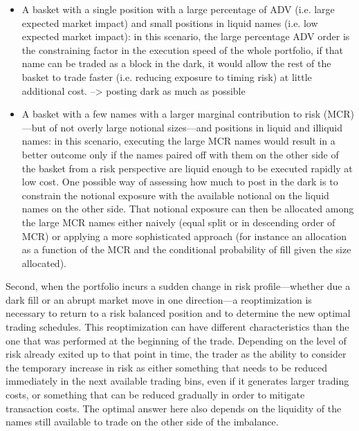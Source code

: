 \begin{itemize}
\item A basket with a single position with a large percentage of ADV (i.e. large expected market impact) and small positions in liquid names (i.e. low expected market impact): in this scenario, the large percentage ADV order is the constraining factor in the execution speed of the whole portfolio, if that name can be traded as a block in the dark, it would allow the rest of the basket to trade faster (i.e. reducing exposure to timing risk) at little additional cost. --> posting dark as much as possible
\item A basket with a few names with a larger marginal contribution to risk (MCR)---but of not overly large notional sizes---and positions in liquid and illiquid names: in this scenario, executing the large MCR names would result in a better outcome only if the names paired off with them on the other side of the basket from a risk perspective are liquid enough to be executed rapidly at low cost. One possible way of assessing how much to post in the dark is to constrain the notional exposure with the available notional on the liquid names on the other side. That notional exposure can then be allocated among the large MCR names either naively (equal split or in descending order of MCR) or applying a more sophisticated approach (for instance an allocation as a function of the MCR and the conditional probability of fill given the size allocated).
\end{itemize}


Second, when the portfolio incurs a sudden change in risk profile---whether due a dark fill or an abrupt market move in one direction---a reoptimization is necessary to return to a risk balanced position and to determine the new optimal trading schedules. This reoptimization can have different characteristics than the one that was performed at the beginning of the trade. Depending on the level of risk already exited up to that point in time, the trader as the ability to consider the temporary increase in risk as either something that needs to be reduced immediately in the next available trading bins, even if it generates larger trading costs, or something that can be reduced gradually in order to mitigate transaction costs. The optimal answer here also depends on the liquidity of the names still available to trade on the other side of the imbalance. \twomedskip


